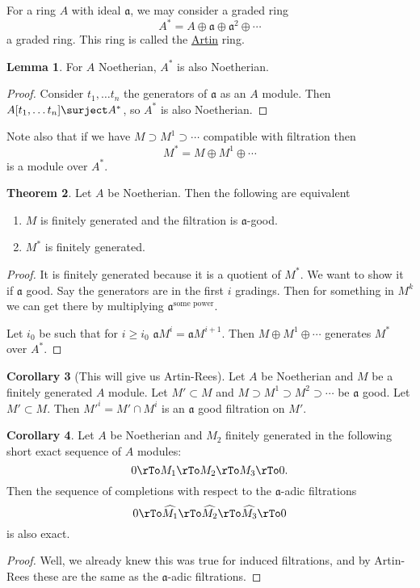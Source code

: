 \documentclass[12 pt]{article}
\theoremstyle{definition}
\newtheorem{theorem}{Theorem}[section]
\newtheorem{corollary}[theorem]{Corollary}
\newtheorem{lemma}[theorem]{Lemma}
\newcommand\fa{{\mathfrak a}}
\begin{document}
\begin{definition}
For a ring $A$ with ideal $\fa$, we may consider a graded ring
\[A^*=A \oplus \fa \oplus \fa^2 \oplus \cdots\]
a graded ring. This ring is called the \underline{Artin} ring.
\end{definition}

\begin{lemma} For $A$ Noetherian, $A^*$ is also Noetherian.
\end{lemma}
\begin{proof} Consider $t_1, \ldots t_n$ the generators of $\fa$ as an $A$ module. Then $A[t_1, \ldots t_n] \surject A^*$, so $A^*$ is also Noetherian.
\end{proof}

Note also that if we have $M \supset M^1 \supset \cdots$ compatible with filtration then
\[M^*=M \oplus M^1 \oplus \cdots\]
is a module over $A^*$.



\begin{theorem} Let $A$ be Noetherian. Then the following are equivalent
\begin{enumerate}
\item $M$ is finitely generated and the filtration is $\fa$-good.
\item $M^*$ is finitely generated.
\end{enumerate}
\end{theorem}

\begin{proof}

 It is finitely generated because it is a quotient of $M^*$. We want to show it if $\fa$ good. Say the generators are in the first $i$ gradings. Then for something in $M^k$ we can get there by multiplying $\fa^\text{some power}$.

 Let $i_0$ be such that for $i \geq i_0$ $\fa M^i=\fa M^{i+1}$. Then $M \oplus M^1 \oplus \cdots$ generates $M^*$ over $A^*$.
\end{proof}

\begin{corollary} [This will give us Artin-Rees] Let $A$ be Noetherian and $M$ be a finitely generated $A$ module. Let $M' \subset M$ and $M \supset M^1 \supset M^2 \supset \cdots $ be $\fa$ good. Let $M' \subset M$. Then $M'^i=M'\cap M^i$ is an $\fa$ good filtration on $M'$.
\end{corollary}

\begin{corollary} Let $A$ be Noetherian and $M_2$ finitely generated in the following short exact sequence of $A$ modules:
\[0 \rTo M_1 \rTo M_2 \rTo M_3 \rTo 0.\]
Then the sequence of completions with respect to the $\fa$-adic filtrations
\[0 \rTo \widehat{M_1} \rTo \widehat{M_2} \rTo \widehat{M_3} \rTo 0\]
is also exact.
\label{adic copmletion exact}
\end{corollary}
\begin{proof} Well, we already knew this was true for induced filtrations, and by Artin-Rees these are the same as the $\fa$-adic filtrations.
\end{proof}
\end{document}
